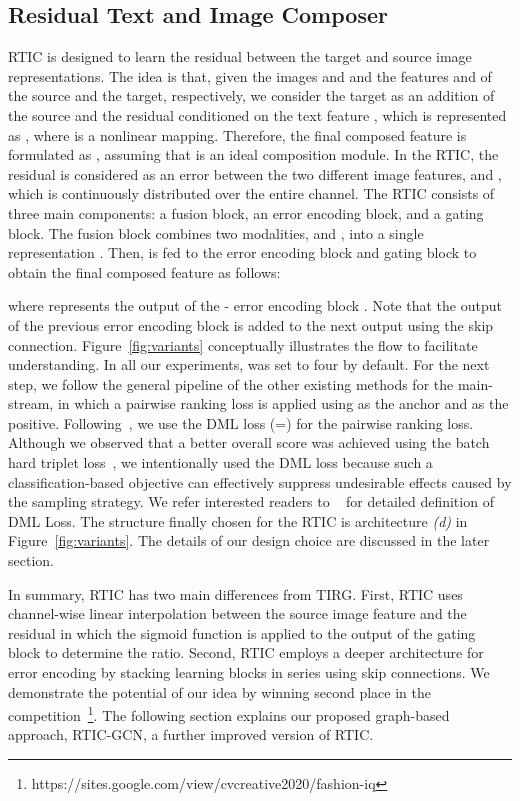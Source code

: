 \documentclass[10pt,twocolumn,letterpaper]{article}
\begin{document}
\subsection{Residual Text and Image Composer}
RTIC is designed to learn the residual between the target and source image representations. The idea is that, given the images  and  and the features  and  of the source and the target, respectively, we consider the target  as an addition of the source  and the residual  conditioned on the text feature , which is represented as , where  is a nonlinear mapping. Therefore, the final composed feature  is formulated as , assuming that  is an ideal composition module. In the RTIC, the residual  is considered as an error between the two different image features,  and , which is continuously distributed over the entire channel. The RTIC consists of three main components: a fusion block, an error encoding block, and a gating block. The fusion block  combines two modalities,  and , into a single representation . Then,  is fed to the error encoding block  and gating block  to obtain the final composed feature  as follows:

where  represents the output of the - error encoding block . Note that the output of the previous error encoding block  is added to the next output using the skip connection. Figure~\ref{fig:variants} conceptually illustrates the flow to facilitate understanding. In all our experiments,  was set to four by default. For the next step, we follow the general pipeline of the other existing methods for the main-stream, in which a pairwise ranking loss is applied using  as the anchor and  as the positive. Following~\cite{vo2019composing}, we use the DML loss (=) for the pairwise ranking loss. Although we observed that a better overall score was achieved using the batch hard triplet loss~\cite{hermans2017defense}, we intentionally used the DML loss because such a classification-based objective can effectively suppress undesirable effects caused by the sampling strategy. We refer interested readers to ~\cite{vo2019composing} for detailed definition of DML Loss. The structure finally chosen for the RTIC is architecture \textit{(d)} in Figure~\ref{fig:variants}. The details of our design choice are discussed in the later section.

In summary, RTIC has two main differences from TIRG. First, RTIC uses channel-wise linear interpolation between the source image feature  and the residual  in which the sigmoid function is applied to the output of the gating block  to determine the ratio. Second, RTIC employs a deeper architecture for error encoding by stacking  learning blocks in series using skip connections. We demonstrate the potential of our idea by winning second place in the competition~\footnote{https://sites.google.com/view/cvcreative2020/fashion-iq}. The following section explains our proposed graph-based approach, RTIC-GCN, a further improved version of RTIC.
\end{document}
